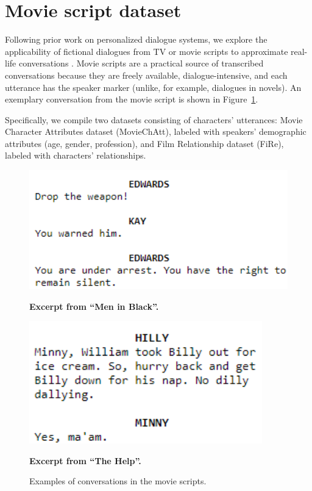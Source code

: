 \section{Movie script dataset}
\label{fire}

Following prior work on personalized dialogue systems, we explore the applicability of fictional dialogues from TV or movie scripts to approximate real-life conversations \cite{li2016persona, lin2011all}. Movie scripts are a practical source of transcribed conversations because they are freely available, dialogue-intensive, and each utterance has the speaker marker (unlike, for example, dialogues in novels). An exemplary conversation from the movie script is shown in Figure~\ref{fig:movie-script}. 

Specifically, we compile two datasets consisting of characters' utterances: Movie Character Attributes dataset (MovieChAtt), labeled with speakers' demographic attributes (age, gender, profession), and Film Relationship dataset (FiRe), labeled with characters' relationships.

\begin{figure}
\centering
\begin{minipage}[t]{0.47\textwidth}
\centering
\includegraphics[width=1.1\textwidth]{pics/men in black.png}
\vspace*{-3mm}
\caption*{{\small \textbf{Excerpt from ``Men in Black''.}}}
\label{fig:2figsA}
\end{minipage}
\qquad
\begin{minipage}[t]{0.45\textwidth}
\includegraphics[width=0.9\textwidth]{pics/the help.png}
\vspace*{2.2mm}
\caption*{{\small \textbf{Excerpt from ``The Help''.}}}
\label{fig:2figsB}
\end{minipage}
\label{fig:movie-script}
\caption{Examples of conversations in the movie scripts.}
\end{figure}


